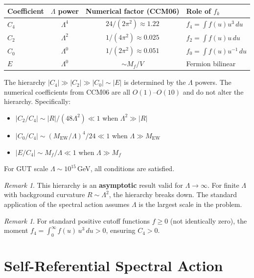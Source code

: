\documentclass[11pt,a4paper]{article}
\theoremstyle{remark}
\newtheorem{remark}[theorem]{Remark}
\begin{document}
\begin{table}[h]
\centering
\begin{tabular}{lccl}
\toprule
Coefficient & $\Lambda$ power & Numerical factor (CCM06) & Role of $f_k$ \\
\midrule
$C_4$ & $\Lambda^4$ & $24/(2\pi^2) \approx 1.22$ & $f_4 = \int f(u) u^3\,du$ \\
$C_2$ & $\Lambda^2$ & $1/(4\pi^2) \approx 0.025$ & $f_2 = \int f(u) u\,du$ \\
$C_0$ & $\Lambda^0$ & $1/(2\pi^2) \approx 0.051$ & $f_0 = \int f(u) u^{-1}\,du$ \\
$E$ & $\Lambda^0$ & $\sim M_f / V$ & Fermion bilinear \\
\bottomrule
\end{tabular}
\end{table}

The hierarchy $|C_4| \gg |C_2| \gg |C_0| \sim |E|$ is determined by the $\Lambda$ powers. The numerical coefficients from CCM06 are all $O(1)$--$O(10)$ and do not alter the hierarchy. Specifically:
\begin{itemize}
  \item $|C_2/C_4| \sim |R|/(48\Lambda^2) \ll 1$ when $\Lambda^2 \gg |R|$
  \item $|C_0/C_4| \sim (M_{\mathrm{EW}}/\Lambda)^4 / 24 \ll 1$ when $\Lambda \gg M_{\mathrm{EW}}$
  \item $|E/C_4| \sim M_f / \Lambda \ll 1$ when $\Lambda \gg M_f$
\end{itemize}
For GUT scale $\Lambda \sim 10^{15}$\,GeV, all conditions are satisfied.

\begin{remark}
This hierarchy is an \textbf{asymptotic} result valid for $\Lambda \to \infty$. For finite $\Lambda$ with background curvature $R \sim \Lambda^2$, the hierarchy breaks down. The standard application of the spectral action assumes $\Lambda$ is the largest scale in the problem.
\end{remark}

\begin{remark}
For standard positive cutoff functions $f \geq 0$ (not identically zero), the moment $f_4 = \int_0^\infty f(u)\, u^3\, du > 0$, ensuring $C_4 > 0$.
\end{remark}

\section{Self-Referential Spectral Action}
\end{document}
